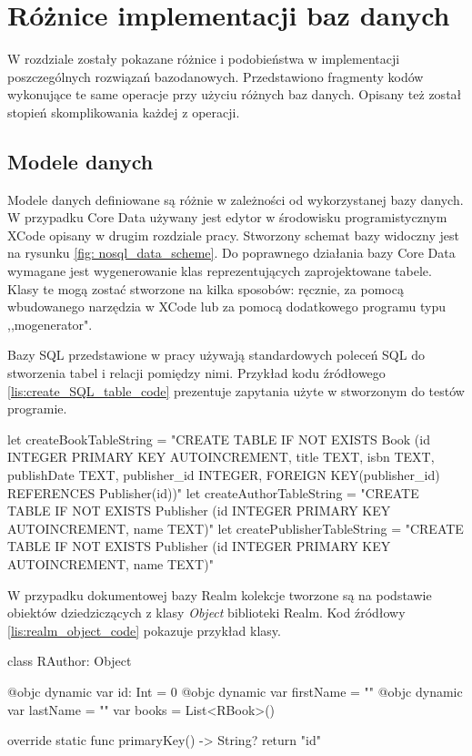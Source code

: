 \section{Różnice implementacji baz danych}

W rozdziale zostały pokazane różnice i podobieństwa w implementacji poszczególnych rozwiązań bazodanowych. Przedstawiono fragmenty kodów wykonujące te same operacje przy użyciu różnych baz danych. Opisany też został stopień skomplikowania każdej z operacji. 

\subsection{Modele danych}
Modele danych definiowane są różnie w zależności od wykorzystanej bazy danych. W przypadku Core Data używany jest edytor w środowisku programistycznym XCode opisany w drugim rozdziale pracy. Stworzony schemat bazy widoczny jest na rysunku \ref{fig: nosql_data_scheme}. Do poprawnego działania bazy Core Data wymagane jest wygenerowanie klas reprezentujących zaprojektowane tabele. Klasy te mogą zostać stworzone na kilka sposobów: ręcznie, za pomocą wbudowanego narzędzia w XCode lub za pomocą dodatkowego programu typu ,,mogenerator". 

Bazy SQL przedstawione w pracy używają standardowych poleceń SQL do stworzenia tabel i relacji pomiędzy nimi. Przykład kodu źródłowego \ref{lis:create_SQL_table_code} prezentuje zapytania użyte w stworzonym do testów  programie. 

\begin{code}[
		language=swift,
		caption={Polecenia tworzenia tabel w SQLite i FMDB},
		label={lis:create_SQL_table_code},
	]
    let createBookTableString = "CREATE TABLE IF NOT EXISTS Book (id INTEGER PRIMARY KEY AUTOINCREMENT, title TEXT, isbn TEXT, publishDate TEXT, publisher_id INTEGER, FOREIGN KEY(publisher_id) REFERENCES Publisher(id))"
    let createAuthorTableString = "CREATE TABLE IF NOT EXISTS Publisher (id INTEGER PRIMARY KEY AUTOINCREMENT, name TEXT)"
    let createPublisherTableString = "CREATE TABLE IF NOT EXISTS Publisher (id INTEGER PRIMARY KEY AUTOINCREMENT, name TEXT)"
\end{code}

W przypadku dokumentowej bazy Realm kolekcje tworzone są na podstawie obiektów dziedziczących z klasy \textit{Object} biblioteki Realm. Kod źródłowy \ref{lis:realm_object_code} pokazuje przykład klasy.

\begin{code}[
		language=swift,
		caption={Przykład obiektu bazy Realm},
		label={lis:realm_object_code},
	]
class RAuthor: Object {
    
    @objc dynamic var id: Int = 0
    @objc dynamic var firstName = ""
    @objc dynamic var lastName = ""    
    var books = List<RBook>()
    
    override static func primaryKey() -> String? {
        return "id"
    }
}
\end{code}

